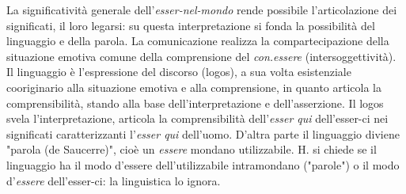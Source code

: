 \documentclass[a4paper,12pt,oneside]{article}%
\begin{document}
La significatività generale dell'\textit{esser-nel-mondo} rende possibile l'articolazione dei significati, il loro legarsi: su questa interpretazione si fonda la possibilità del linguaggio e della parola. La comunicazione realizza la compartecipazione della situazione emotiva comune della comprensione del \textit{con.essere} (intersoggettività). Il linguaggio  è l'espressione del discorso (logos), a sua volta esistenziale cooriginario alla situazione emotiva e alla comprensione, in quanto articola la comprensibilità, stando alla base dell'interpretazione e dell'asserzione. Il logos svela l'interpretazione, articola la comprensibilità dell'\textit{esser qui} dell'esser-ci nei significati caratterizzanti l'\textit{esser qui} dell'uomo. D'altra parte il linguaggio diviene "parola (de Saucerre)", cioè un \textit{essere} mondano utilizzabile. H. si chiede se il linguaggio ha il modo d'essere dell'utilizzabile intramondano ("parole") o il modo d'\textit{essere} dell'esser-ci: la linguistica lo ignora.
\end{document}
